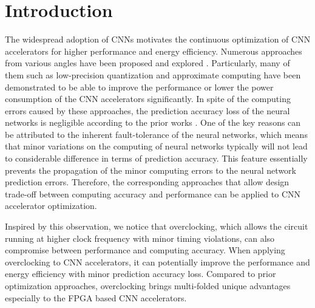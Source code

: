 \section{Introduction} \label{sec:intro}
The widespread adoption of CNNs motivates the 
continuous optimization of CNN accelerators for higher 
performance and energy efficiency. 
Numerous approaches from various 
angles have been proposed and explored \cite{EIE_han_2016}\cite{deepburing_12}. 
Particularly, many of them such as 
low-precision quantization \cite{Hwang2014_17} 
and approximate computing \cite{Approximate_Multiplier_31}
have been demonstrated to 
be able to improve the performance or lower the power consumption of the CNN 
accelerators significantly. In spite of the computing errors caused by these approaches, 
the prediction accuracy loss of the neural networks is negligible according to the prior works \cite{deep_compress_han_2015}.
One of the key reasons can be attributed to the inherent fault-tolerance of 
the neural networks, which means that minor variations on the 
computing of neural networks typically will not lead to considerable 
difference in terms of prediction accuracy. This 
feature essentially prevents the propagation of 
the minor computing errors to the neural network prediction errors. 
Therefore, the corresponding approaches that allow design trade-off 
between computing accuracy and performance can be applied to CNN 
accelerator optimization.

Inspired by this observation, we notice that overclocking, which 
allows the circuit running at higher clock frequency with minor 
timing violations, can also compromise between performance 
and computing accuracy. When applying overclocking to CNN accelerators, 
it can potentially improve the performance and energy 
efficiency with minor prediction accuracy loss.
Compared to prior optimization approaches, overclocking brings 
multi-folded unique advantages especially to the FPGA based CNN 
accelerators. 

